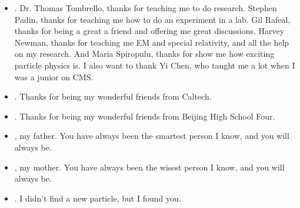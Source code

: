 \begin{itemize}
	\item {}. Dr. Thomas Tombrello, thanks for teaching me to do research. Stephen Padin, thanks for teaching me how to do an experiment in a lab. Gil Rafeal, thanks for being a great a friend and offering me great discussions. Harvey Newman, thanks for teaching me EM and special relativity, and all the help on my research. And Maria Spiropulu, thanks for show me how exciting particle physics is. I also want to thank Yi Chen, who taught me a lot when I was a junior on CMS.
	\item {}. Thanks for being my wonderful friends from Caltech.
	\item {}. Thanks for being my wonderful friends from Beijing High School Four.
	\item {}, my father. You have always been the smartest person I know, and you will always be.
	\item {}, my mother. You have always been the wisest person I know, and you will always be.
	\item {}. I didn't find a new particle, but I found you.
\end{itemize}



